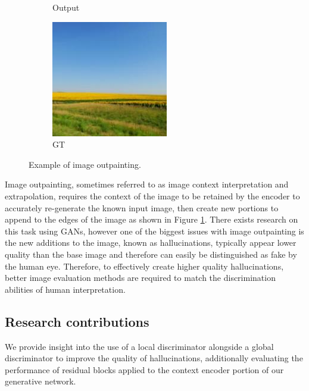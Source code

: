 \documentclass{article}
\begin{document}
\begin{figure}
\begin{subfigure}[b]{0.15\textwidth}
        \caption{Output}
    \end{subfigure}
    \hfill
    \begin{subfigure}[b]{0.15\textwidth}
        \includegraphics[width=\textwidth]{figs/fig1/ground_truth}
        \caption{GT}
    \end{subfigure}
  	\caption{Example of image outpainting.}
  	\label{fig:fig1}
\end{figure}

Image outpainting, sometimes referred to as image context interpretation and extrapolation, requires the context of the image to be retained by the encoder to accurately re-generate the known input image, then create new portions to append to the edges of the image as shown in Figure \ref{fig:fig1}. There exists research on this task using GANs, however one of the biggest issues with image outpainting is the new additions to the image, known as hallucinations, typically appear lower quality than the base image and therefore can easily be distinguished as fake by the human eye.\cite{sabini_painting_2018} Therefore, to effectively create higher quality hallucinations, better image evaluation methods are required to match the discrimination abilities of human interpretation.

\subsection{Research contributions}
We provide insight into the use of a local discriminator alongside a global discriminator to improve the quality of hallucinations, additionally evaluating the performance of residual blocks applied to the context encoder portion of our generative network. 
\end{document}
